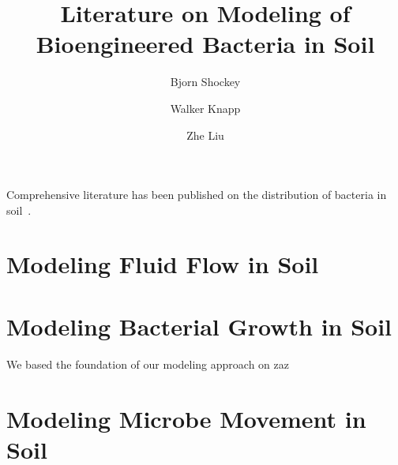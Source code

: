 \documentclass[journal = bichaw, biochem=true]{achemso}
\title{Literature on Modeling of Bioengineered Bacteria in Soil}
\author[1]{Bjorn Shockey}
\author[1]{Walker Knapp}
\author[1]{Zhe Liu}
\affil[1]{College of William and Mary}
\begin{document}

    Comprehensive literature has been published on the distribution of bacteria in soil~\cite{TimsinaRameshChandra2021AMMf}.


    \section{Modeling Fluid Flow in Soil}\label{sec:modeling-fluid-flow-in-soil}


    \section{Modeling Bacterial Growth in Soil}\label{sec:modeling-bacterial-growth-in-soil}
We based the foundation of our modeling approach on zaz

    \section{Modeling Microbe Movement in Soil}\label{sec:modeling-microbe-movement-in-soil}

    
\end{document}
